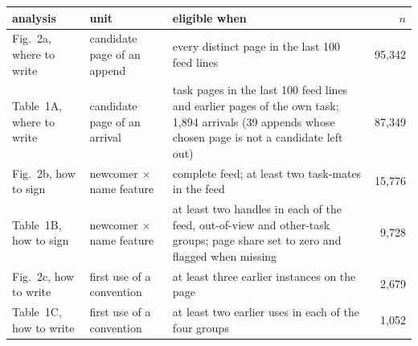 \begin{tabular}{lp{3.2cm}p{6.2cm}r}
\toprule
analysis & unit & eligible when & $n$ \\
\midrule
Fig.~2a, where to write & candidate page of an append & every distinct page in the last 100 feed lines & 95,342 \\
Table~1A, where to write & candidate page of an arrival & task pages in the last 100 feed lines and earlier pages of the own task; 1,894 arrivals (39 appends whose chosen page is not a candidate left out) & 87,349 \\
Fig.~2b, how to sign & newcomer $\times$ name feature & complete feed; at least two task-mates in the feed & 15,776 \\
Table~1B, how to sign & newcomer $\times$ name feature & at least two handles in each of the feed, out-of-view and other-task groups; page share set to zero and flagged when missing & 9,728 \\
Fig.~2c, how to write & first use of a convention & at least three earlier instances on the page & 2,679 \\
Table~1C, how to write & first use of a convention & at least two earlier uses in each of the four groups & 1,052 \\
\bottomrule
\end{tabular}
